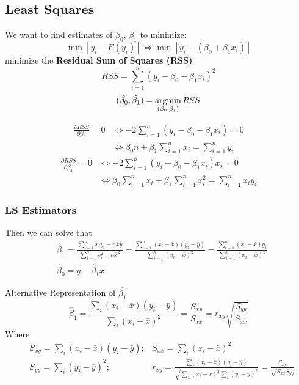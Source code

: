 \documentclass[11pt,a4paper]{article}
\newcommand{\argmin}{\operatornamewithlimits{argmin}}
\begin{document}
\subsection{Least Squares}
We want to find estimates of $\beta_0$, $\beta_1$ to minimize:
$$\min [y_i-E(y_i)]\Leftrightarrow \min [y_i-(\beta_0+\beta_1 x_i)]$$
minimize the \textbf{Residual Sum of Squares (RSS)}
$$RSS=\sum_{i=1}^n(y_i-\beta_0-\beta_1 x_i)^2$$
$$(\hat{\beta_0},\hat{\beta_1})=\argmin_{(\beta_0,\beta_1)}RSS$$

$$\begin{aligned}
    \frac{\partial RSS}{\partial \beta_0}=0 &\Leftrightarrow -2\sum_{i=1}^n(y_i-\beta_0-\beta_1 x_i)=0\\
    & \Leftrightarrow \beta_0 n+\beta_1\sum_{i=1}^n x_i=\sum_{i=1}^n y_i
\end{aligned}$$
$$\begin{aligned}
    \frac{\partial RSS}{\partial \beta_1}=0 &\Leftrightarrow -2\sum_{i=1}^n(y_i-\beta_0-\beta_1 x_i)x_i=0\\
    &\Leftrightarrow \beta_0 \sum_{i=1}^nx_i+\beta_1\sum_{i=1}^n x_i^2=\sum_{i=1}^n x_iy_i
\end{aligned}$$

\subsubsection{LS Estimators}
Then we can solve that
$$\begin{aligned}
&\hat{\beta}_{1}=\frac{\sum_{i=1}^{n} x_{i} y_{i}-n \bar{x} \bar{y}}{\sum_{i=1}^{n} x_{i}^{2}-n \bar{x}^{2}}=\frac{\sum_{i=1}^{n}\left(x_{i}-\bar{x}\right)\left(y_{i}-\bar{y}\right)}{\sum_{i=1}^{n}\left(x_{i}-\bar{x}\right)^{2}}=\frac{\sum_{i=1}^{n}\left(x_{i}-\bar{x}\right)y_{i}}{\sum_{i=1}^{n}\left(x_{i}-\bar{x}\right)^{2}} \\
&\hat{\beta}_{0}=\bar{y}-\hat{\beta}_{1} \bar{x}
\end{aligned}$$

Alternative Representation of $\hat{\beta_1}$
$$\hat{\beta}_{1}=\frac{\sum_{i}\left(x_{i}-\bar{x}\right)\left(y_{i}-\bar{y}\right)}{\sum_{i}\left(x_{i}-\bar{x}\right)^{2}}=\frac{S_{x y}}{S_{x x}}=r_{x y} \sqrt{\frac{S_{y y}}{S_{x x}}}$$
Where 
\begin{equation}
    \begin{aligned}
        &S_{xy}=\sum_{i}\left(x_{i}-\bar{x}\right)\left(y_{i}-\bar{y}\right); &S_{xx}=\sum_{i}\left(x_{i}-\bar{x}\right)^{2}\\
        &S_{yy}=\sum_{i}\left(y_{i}-\bar{y}\right)^{2}; &r_{xy}=\frac{\sum_{i}\left(x_{i}-\bar{x}\right)\left(y_{i}-\bar{y}\right)}{\sqrt{\sum_{i}\left(x_{i}-\bar{x}\right)^{2}\sum_{i}\left(y_{i}-\bar{y}\right)^{2}}}=\frac{S_{xy}}{\sqrt{S_{xx}S_{yy}}}
    \end{aligned}
    \nonumber
\end{equation}
\end{document}
